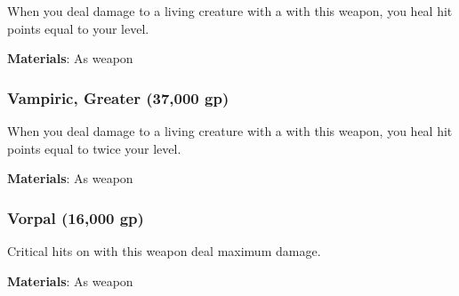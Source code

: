 When you deal damage to a living creature with a  with this weapon, you heal hit points equal to your level.



\vspace{0.25em}
\textbf{Materials}: As weapon


\lowercase{\hypertarget{item:Vampiric, Greater}{}}\label{item:Vampiric, Greater}
\hypertarget{item:Vampiric, Greater}{\subsubsection{Vampiric, Greater\hfill{} (37,000 gp)}}

When you deal damage to a living creature with a  with this weapon, you heal hit points equal to twice your level.



\vspace{0.25em}
\textbf{Materials}: As weapon


\lowercase{\hypertarget{item:Vorpal}{}}\label{item:Vorpal}
\hypertarget{item:Vorpal}{\subsubsection{Vorpal\hfill{} (16,000 gp)}}

Critical hits on  with this weapon deal maximum damage.



\vspace{0.25em}
\textbf{Materials}: As weapon
